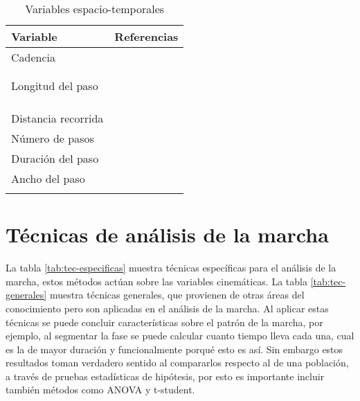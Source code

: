 \begin{table}
    \centering
    \caption{Variables espacio-temporales}
    \label{tab:espacio-temp}
    \begin{tabular}{ll}
        \toprule
        Variable & Referencias \\
        \midrule
        Cadencia & \cite{menz, cuaya, franklin} \\
                 & \cite{muro, lei, prakash} \\
                 & \cite{flora, latt, mazza} \\
        Longitud del paso & \cite{menz,franklin, mizoguchi} \\
                   & \cite{forneris, lei, yang2} \\
                   & \cite{prakash, latt, punt} \\
                   & \cite{bruijn} \\
         Distancia recorrida & \cite{cuaya, muro}  \\
         Número de pasos & \cite{cuaya} \\
         Duración del paso & \cite{cuaya, forneris} \\
         Ancho del paso & \cite{muro, yang2, flora} \\
                        & \cite{punt, choi} \\
        \bottomrule
    \end{tabular}
\end{table}

\section[Técnicas]{Técnicas de análisis de la marcha}

La tabla \ref{tab:tec-especificas} muestra técnicas específicas para el análisis de la marcha, estos métodos actúan sobre las variables cinemáticas. La tabla \ref{tab:tec-generales} muestra técnicas generales, que provienen de otras áreas del conocimiento pero son aplicadas en el análisis de la marcha. Al aplicar estas técnicas se puede concluir características sobre el patrón de la marcha, por ejemplo, al segmentar la fase se puede calcular cuanto tiempo lleva cada una, cual es la de mayor duración y funcionalmente porqué esto es así. Sin embargo estos resultados toman verdadero sentido al compararlos respecto al de una población, a través de pruebas estadísticas de hipótesis, por esto es importante incluir también métodos como ANOVA y t-student.

